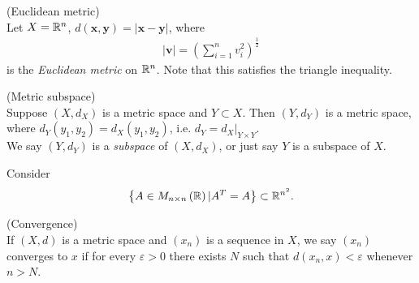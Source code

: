 \documentclass[a4paper]{article}
\begin{document}
\begin{eg}(Euclidean metric)\\
Let $X=\mathbb{R}^n$, $d\left(\mathbf{x},\mathbf{y}\right) = |\mathbf{x}-\mathbf{y}|$, where
\begin{equation*}
\begin{aligned}
|\mathbf{v}| = \left(\sum_{i=1}^n v_i^2\right)^\frac{1}{2}
\end{aligned}
\end{equation*}
is the \emph{Euclidean metric} on $\mathbb{R}^n$. Note that this satisfies the triangle inequality.
\end{eg}

\begin{eg} (Metric subspace)\\
Suppose $\left(X,d_X\right)$ is a metric space and $Y\subset X$. Then $\left(Y,d_Y\right)$ is a metric space, where $d_Y\left(y_1,y_2\right) = d_X\left(y_1,y_2\right)$, i.e. $d_Y=d_X |_{Y\times Y}$.\\
We say $\left(Y,d_Y\right)$ is a \emph{subspace} of $\left(X,d_X\right)$, or just say $Y$ is a subspace of $X$.
\end{eg}

\begin{eg}
Consider
\begin{equation*}
\begin{aligned}
\left\{A \in M_{n\times n} \left(\mathbb{R}\right) | A^T = A \right\} \subset \mathbb{R}^{n^2}.
\end{aligned}
\end{equation*} 
\end{eg}

\begin{defi} (Convergence)\\
If $\left(X,d\right)$ is a metric space and $\left(x_n\right)$ is a sequence in $X$, we say $\left(x_n\right)$ converges to $x$ if for every $\varepsilon >0$ there exists $N$ such that $d\left(x_n,x\right) < \varepsilon$ whenever $n>N$.
\end{defi}
\end{document}
